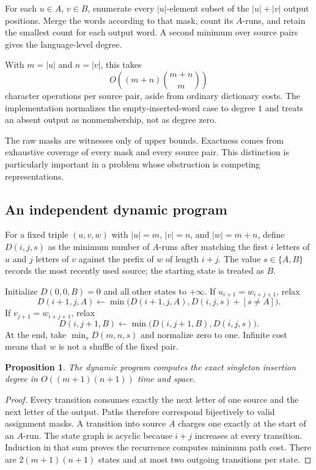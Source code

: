 \documentclass[11pt,letterpaper]{article}
\newtheorem{proposition}[theorem]{Proposition}
\theoremstyle{definition}\newtheorem{definition}[theorem]{Definition}
\theoremstyle{remark}\newtheorem{remark}[theorem]{Remark}
\theoremstyle{definition}\newtheorem{question}[theorem]{Question}
\begin{document}
For each $u\in A$, $v\in B$, enumerate every $|u|$-element subset of the $|u|+|v|$ output positions. Merge the words according to that mask, count its $A$-runs, and retain the smallest count for each output word. A second minimum over source pairs gives the language-level degree.

With $m=|u|$ and $n=|v|$, this takes
\[
 O\left((m+n)\binom{m+n}{m}\right)
\]
character operations per source pair, aside from ordinary dictionary costs. The implementation normalizes the empty-inserted-word case to degree $1$ and treats an absent output as nonmembership, not as degree zero.

The raw masks are witnesses only of upper bounds. Exactness comes from exhaustive coverage of every mask and every source pair. This distinction is particularly important in a problem whose obstruction is competing representations.

\subsection{An independent dynamic program}

For a fixed triple $(u,v,w)$ with $|u|=m$, $|v|=n$, and $|w|=m+n$, define $D(i,j,s)$ as the minimum number of $A$-runs after matching the first $i$ letters of $u$ and $j$ letters of $v$ against the prefix of $w$ of length $i+j$. The value $s\in\{A,B\}$ records the most recently used source; the starting state is treated as $B$.

Initialize $D(0,0,B)=0$ and all other states to $+\infty$. If $u_{i+1}=w_{i+j+1}$, relax
\[
 D(i+1,j,A)\gets\min\bigl(D(i+1,j,A),D(i,j,s)+[s\neq A]\bigr).
\]
If $v_{j+1}=w_{i+j+1}$, relax
\[
 D(i,j+1,B)\gets\min\bigl(D(i,j+1,B),D(i,j,s)\bigr).
\]
At the end, take $\min_sD(m,n,s)$ and normalize zero to one. Infinite cost means that $w$ is not a shuffle of the fixed pair.

\begin{proposition}
The dynamic program computes the exact singleton insertion degree in $O((m+1)(n+1))$ time and space.
\end{proposition}
\begin{proof}
Every transition consumes exactly the next letter of one source and the next letter of the output. Paths therefore correspond bijectively to valid assignment masks. A transition into source $A$ charges one exactly at the start of an $A$-run. The state graph is acyclic because $i+j$ increases at every transition. Induction in that sum proves the recurrence computes minimum path cost. There are $2(m+1)(n+1)$ states and at most two outgoing transitions per state.
\end{proof}
\end{document}
